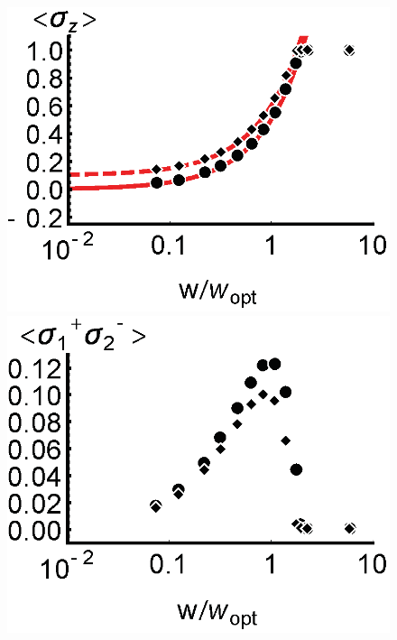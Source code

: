 \documentclass[aps,
twocolumn,
showpacs,
superscriptaddress,groupedaddress]{revtex4}
\begin{document}
\begin{figure}
\begin{center}
	\includegraphics[scale =0.445] {N10000SZ.eps}
	\hspace{-5.0mm} \includegraphics[scale =0.445] {N10000SPSM.eps}

\end{center}
\end{figure}
\end{document}
